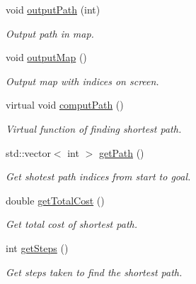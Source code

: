 \begin{DoxyCompactItemize}
void \hyperlink{classPathFindingAlgorithm_a98a59e7a6797895ac08be283850ab534}{output\-Path} (int)
\begin{DoxyCompactList}\small\item\em Output path in map. \end{DoxyCompactList}\item 
void \hyperlink{classPathFindingAlgorithm_a836f5c7fd0ea0e2201ed954f55ca523b}{output\-Map} ()
\begin{DoxyCompactList}\small\item\em Output map with indices on screen. \end{DoxyCompactList}\item 
virtual void \hyperlink{classPathFindingAlgorithm_adbd9dfe9d49577e9420669f59c290f55}{comput\-Path} ()
\begin{DoxyCompactList}\small\item\em Virtual function of finding shortest path. \end{DoxyCompactList}\item 
std\-::vector$<$ int $>$ \hyperlink{classPathFindingAlgorithm_a2c614eeead913e62288faa5499467529}{get\-Path} ()
\begin{DoxyCompactList}\small\item\em Get shotest path indices from start to goal. \end{DoxyCompactList}\item 
double \hyperlink{classPathFindingAlgorithm_a0c0eaaa84d7739a3c09ad012b37e8bd9}{get\-Total\-Cost} ()
\begin{DoxyCompactList}\small\item\em Get total cost of shortest path. \end{DoxyCompactList}\item 
int \hyperlink{classPathFindingAlgorithm_a6d2b42a027cd39039861f148cbf624f0}{get\-Steps} ()
\begin{DoxyCompactList}\small\item\em Get steps taken to find the shortest path. \end{DoxyCompactList}\end{DoxyCompactItemize}
